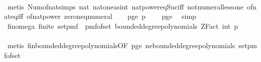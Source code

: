 \begin{isabellebody}
\ \ \ \ \isamarkupfalse%
\ {\isacharparenleft}{\kern0pt}metis\ Num{\isachardot}{\kern0pt}of{\isacharunderscore}{\kern0pt}nat{\isacharunderscore}{\kern0pt}simps{\isacharparenleft}{\kern0pt}{}{\isacharparenright}{\kern0pt}\ nat{\isacharunderscore}{\kern0pt}{}\ nat{\isacharunderscore}{\kern0pt}one{\isacharunderscore}{\kern0pt}as{\isacharunderscore}{\kern0pt}int\ nat{\isacharunderscore}{\kern0pt}power{\isacharunderscore}{\kern0pt}eq{\isacharunderscore}{\kern0pt}Suc{\isacharunderscore}{\kern0pt}{}{\isacharunderscore}{\kern0pt}iff\ not{\isacharunderscore}{\kern0pt}numeral{\isacharunderscore}{\kern0pt}less{\isacharunderscore}{\kern0pt}one\ of{\isacharunderscore}{\kern0pt}nat{\isacharunderscore}{\kern0pt}eq{\isacharunderscore}{\kern0pt}iff\ of{\isacharunderscore}{\kern0pt}nat{\isacharunderscore}{\kern0pt}power\ zero{\isacharunderscore}{\kern0pt}neq{\isacharunderscore}{\kern0pt}numeral{\isacharparenright}{\kern0pt}\isanewline
\isanewline
\ \ \isamarkupfalse%
\ p{\isacharunderscore}{\kern0pt}ge{\isacharunderscore}{\kern0pt}{}{\isacharcolon}{\kern0pt}\ {\isachardoublequoteopen}p\ {\isachargreater}{\kern0pt}\ {}{\isachardoublequoteclose}\ \isamarkupfalse%
\ p{\isacharunderscore}{\kern0pt}ge{\isacharunderscore}{\kern0pt}{}\ \isamarkupfalse%
\ simp\isanewline
\isanewline
\ \ \isamarkupfalse%
\ fin{\isacharunderscore}{\kern0pt}omega{\isacharunderscore}{\kern0pt}{}{\isacharcolon}{\kern0pt}\ {\isachardoublequoteopen}finite\ {\isacharparenleft}{\kern0pt}set{\isacharunderscore}{\kern0pt}pmf\ {\isacharparenleft}{\kern0pt}\ pmf{\isacharunderscore}{\kern0pt}of{\isacharunderscore}{\kern0pt}set\ {\isacharparenleft}{\kern0pt}bounded{\isacharunderscore}{\kern0pt}degree{\isacharunderscore}{\kern0pt}polynomials\ {\isacharparenleft}{\kern0pt}ZFact\ {\isacharparenleft}{\kern0pt}int\ p{\isacharparenright}{\kern0pt}{\isacharparenright}{\kern0pt}\ {}{\isacharparenright}{\kern0pt}{\isacharparenright}{\kern0pt}{\isacharparenright}{\kern0pt}{\isachardoublequoteclose}\isanewline
\ \ \ \ \isamarkupfalse%
\ {\isacharparenleft}{\kern0pt}metis\ fin{\isacharunderscore}{\kern0pt}bounded{\isacharunderscore}{\kern0pt}degree{\isacharunderscore}{\kern0pt}polynomials{\isacharbrackleft}{\kern0pt}OF\ p{\isacharunderscore}{\kern0pt}ge{\isacharunderscore}{\kern0pt}{}{\isacharbrackright}{\kern0pt}\ ne{\isacharunderscore}{\kern0pt}bounded{\isacharunderscore}{\kern0pt}degree{\isacharunderscore}{\kern0pt}polynomials\ set{\isacharunderscore}{\kern0pt}pmf{\isacharunderscore}{\kern0pt}of{\isacharunderscore}{\kern0pt}set{\isacharparenright}{\kern0pt}\isanewline

\end{isabellebody}
